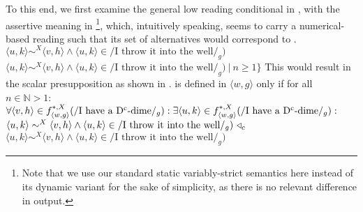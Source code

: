 To this end, we first examine the general low reading conditional in , with the assertive meaning in \footnote{Note that we use our standard static variably-strict semantics here instead of its dynamic variant for the sake of simplicity, as there is no relevant difference in output.}, which, intuitively speaking, seems to carry a numerical-based reading such that its set of alternatives would correspond to .
\pex
\a {}\\\linebreak\emptyfill$\langle u,k\rangle\sim^X\langle v,h\rangle\land\langle u,k\rangle\in/\text{I throw it into the well}/_g)$
\a {}\\\linebreak\emptyfill$\langle u,k\rangle\sim^X\langle v,h\rangle\land\langle u,k\rangle\in/\text{I throw it into the well}/_g)~|~n\geqslant1\}$
\xe
This would result in the scalar presupposition as shown in .
\ex
{}\linebreak
is defined in $\langle w,g\rangle$ only if for all $n\in\mathbb{N}>1$:\\
$\forall{\langle v,h\rangle\in f^{*,X}_{\langle w,g\rangle}(/\text{I have a D\textsuperscript{c}-dime}/_g)}:\exists\langle u,k\rangle\in f^{*,X}_{\langle w,g\rangle}(/\text{I have a D\textsuperscript{c}-dime}/_g):$\linebreak\emptyfill$\langle u,k\rangle\sim^X\langle v,h\rangle\land\langle u,k\rangle\in/\text{I throw it into the well}/_g)~\triangleleft_c$\\
\linebreak\emptyfill$\langle u,k\rangle\sim^X\langle v,h\rangle\land\langle u,k\rangle\in/\text{I throw it into the well}/_g)$
